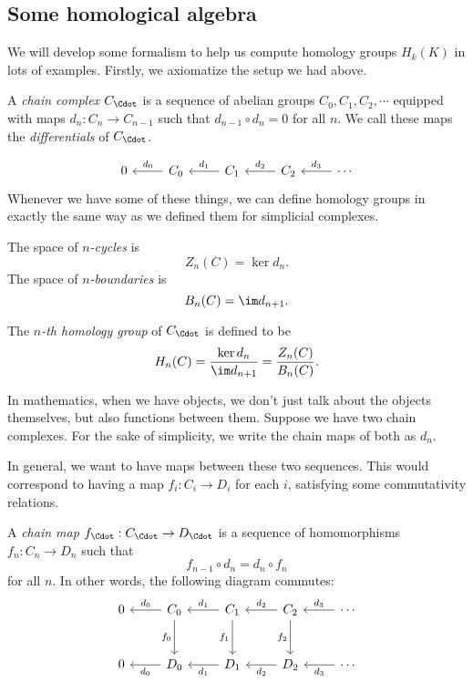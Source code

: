 \documentclass[a4paper]{article}
\begin{document}
\subsection{Some homological algebra}
We will develop some formalism to help us compute homology groups $H_k(K)$ in lots of examples. Firstly, we axiomatize the setup we had above.
\begin{defi}
  A \emph{chain complex} $C_{\Cdot}$ is a sequence of abelian groups $C_0, C_1, C_2, \cdots$ equipped with maps $d_n: C_n \to C_{n - 1}$ such that $d_{n - 1} \circ d_n = 0$ for all $n$. We call these maps the \emph{differentials} of $C_{\Cdot}$.
\end{defi}
\[
  \begin{tikzcd}
    0 & C_0 \ar[l, "d_0"'] & C_1 \ar [l, "d_1"'] & C_2 \ar [l, "d_2"'] & \cdots \ar [l, "d_3"']
  \end{tikzcd}
\]
Whenever we have some of these things, we can define homology groups in exactly the same way as we defined them for simplicial complexes.

\begin{defi}
  The space of \emph{$n$-cycles} is
  \[
    Z_n(C) = \ker d_n.
  \]
  The space of \emph{$n$-boundaries} is
  \[
    B_n(C) = \im d_{n+1}.
  \]
\end{defi}

\begin{defi}
  The \emph{$n$-th homology group} of $C_{\Cdot}$ is defined to be
  \[
    H_n(C) = \frac{\ker d_n}{\im d_{n + 1}} = \frac{Z_n(C)}{B_n(C)}.
  \]
\end{defi}

In mathematics, when we have objects, we don't just talk about the objects themselves, but also functions between them. Suppose we have two chain complexes. For the sake of simplicity, we write the chain maps of both as $d_n$.

In general, we want to have maps between these two sequences. This would correspond to having a map $f_i: C_i \to D_i$ for each $i$, satisfying some commutativity relations.

\begin{defi}
  A \emph{chain map} $f_{\Cdot}: C_{\Cdot}\to D_{\Cdot}$ is a sequence of homomorphisms $f_n: C_n \to D_n$ such that
  \[
    f_{n - 1} \circ d_n = d_n \circ f_n
  \]
  for all $n$. In other words, the following diagram commutes:
  \[
    \begin{tikzcd}[row sep=large]
      0 & C_0 \ar[l, "d_0"'] \ar[d, "f_0"'] & C_1 \ar [l, "d_1"'] \ar[d, "f_1"'] & C_2 \ar [l, "d_2"'] \ar [d, "f_2"'] & \cdots \ar [l, "d_3"']\\
      0 & D_0 \ar[l, "d_0"] & D_1 \ar [l, "d_1"] & D_2 \ar [l, "d_2"] & \cdots \ar [l, "d_3"]
    \end{tikzcd}
  \]
\end{defi}
\end{document}

